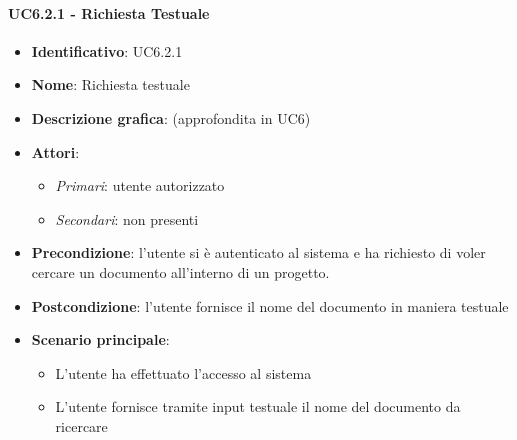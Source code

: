 \paragraph{UC6.2.1 - Richiesta Testuale}
\begin{itemize}
   \item \textbf{Identificativo}: UC6.2.1
   \item \textbf{Nome}: Richiesta testuale
   \item \textbf{Descrizione grafica}: (approfondita in UC6)
   \item \textbf{Attori}:
   \begin{itemize} 
       \item \textit{Primari}: utente autorizzato
       \item \textit{Secondari}: non presenti
   \end{itemize}
       \item \textbf{Precondizione}: l'utente si è autenticato al sistema e ha richiesto di voler cercare un documento all'interno di un progetto.
       \item \textbf{Postcondizione}: l'utente fornisce il nome del documento in maniera testuale
    \item \textbf{Scenario principale}: 
       \begin{itemize}
           \item L'utente ha effettuato l'accesso al sistema 
           \item L'utente fornisce tramite input testuale il nome del documento da ricercare
       \end{itemize}
\end{itemize}

